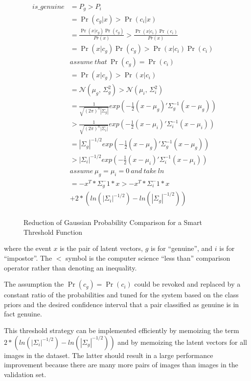 \begin{figure}
\begin{align*}
is\_genuine & = P_g > P_i&\\
        & = \Pr(c_g|x) > \Pr(c_i|x)&\\
        & = \frac{\Pr(x|c_g)\Pr(c_g)}{Pr(x)} > \frac{\Pr(x|c_i)\Pr(c_i)}{Pr(x)}&\\
        & = \Pr(x|c_g)\Pr(c_g) > \Pr(x|c_i)\Pr(c_i)&\\
        & assume\ that\ \Pr(c_g) = \Pr(c_i)&\\ %
        & = \Pr(x|c_g) > \Pr(x|c_i)&\\
        & = \mathcal{N}(\mu_g,\,\Sigma_g^{2}) > \mathcal{N}(\mu_i,\,\Sigma_i^{2})&\\
        & = \frac{1}{\sqrt{(2\pi)^{n}|\Sigma_g|}}exp(-\frac{1}{2}(x-\mu_g)'\Sigma_g^{-1}(x-\mu_g))&\\
        & > \frac{1}{\sqrt{(2\pi)^{n}|\Sigma_i|}}exp(-\frac{1}{2}(x-\mu_i)'\Sigma_i^{-1}(x-\mu_i))&\\
        & = |\Sigma_g|^{-1/2}exp(-\frac{1}{2}(x-\mu_g)'\Sigma_g^{-1}(x-\mu_g))&\\
        & > |\Sigma_i|^{-1/2}exp(-\frac{1}{2}(x-\mu_i)'\Sigma_i^{-1}(x-\mu_i))&\\
        & assume\ \mu_g = \mu_i = 0\ and\ take\ ln&\\
        & = -x^T * \Sigma_g^-1 * x > -x^T * \Sigma_i^-1 * x &\\
        &    + 2 * (ln(|\Sigma_i|^{-1/2}) - ln(|\Sigma_g|^{-1/2}))&\\
\end{align*}
\caption{Reduction of Gaussian Probability Comparison for a Smart Threshold Function}
\label{proof:gaussian}
\end{figure}

where the event $x$ is the pair of latent vectors, $g$ is for ``genuine'', and $i$ is for ``impostor''.
The $<$ symbol is the computer science ``less than'' comparison operator rather than denoting an inequality.

The assumption the $\Pr(c_g) = \Pr(c_i)$ could be revoked and replaced by a constant ratio of the probabilities and tuned for the system based on the class priors and the desired confidence interval that a pair classified as genuine is in fact genuine.

This threshold strategy can be implemented efficiently by memoizing the term $2 * (ln(|\Sigma_i|^{-1/2}) - ln(|\Sigma_g|^{-1/2}))$ and by memoizing the latent vectors for all images in the dataset.
The latter should result in a large performance improvement because there are many more pairs of images than images in the validation set.
